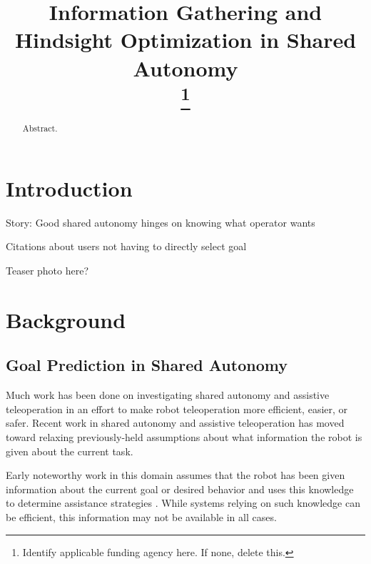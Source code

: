 \documentclass[conference]{IEEEtran}
\begin{document}
\title{Information Gathering and Hindsight Optimization in Shared Autonomy\\
\thanks{Identify applicable funding agency here. If none, delete this.}
}

\author{
\and
{}
}

\maketitle

\begin{abstract}
Abstract.
\end{abstract}

\section{Introduction}

Story: Good shared autonomy hinges on knowing what operator wants

Citations about users not having to directly select goal

Teaser photo here?

\section{Background}
\subsection{Goal Prediction in Shared Autonomy}

Much work has been done on investigating shared autonomy and assistive teleoperation in an effort to make robot teleoperation more efficient, easier, or safer. Recent work in shared autonomy and assistive teleoperation has moved toward relaxing previously-held assumptions about what information the robot is given about the current task. 

Early noteworthy work in this domain assumes that the robot has been given information about the current goal or desired behavior and uses this knowledge to determine assistance strategies \cite{aigner1997human, debus2001cooperative, goodrich2001experiments}. While systems relying on such knowledge can be efficient, this information may not be available in all cases.
\end{document}
